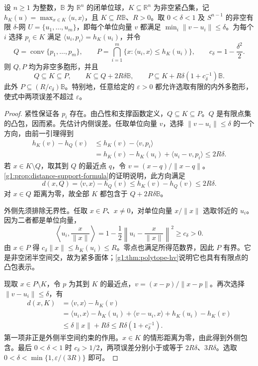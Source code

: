 \begin{theorem}\label{g1:thm:inner-outer-polytope-approximation}
	设 \(n\ge1\) 为整数，\(\mathbb B\) 为 \(\mathbb R^n\) 的闭单位球，\(K\subseteq\mathbb R^n\) 为非空紧凸集，记 \(h_K(u)=\max_{x\in K}\langle u,x\rangle\)，且 \(K\subseteq R\mathbb B\)、\(R>0\)。取 \(0<\delta<1\) 及 \(S^{n-1}\) 的非空有限 \(\delta\)-网 \(U=\{u_1,\ldots,u_m\}\)，即每个单位向量 \(v\) 都满足 \(\min_i\lVert v-u_i\rVert\le\delta\)。为每个 \(i\) 选择 \(p_i\in K\) 满足 \(\langle u_i,p_i\rangle=h_K(u_i)\)，并令
	\[
		Q=\operatorname{conv}\{p_1,\ldots,p_m\},\qquad
		P=\bigcap_{i=1}^m\{x:\langle u_i,x\rangle\le h_K(u_i)\},
		\qquad c_\delta=1-\frac{\delta^2}{2}.
	\]
	则 \(Q,P\) 均为非空多胞形，并且
	\begin{equation}\label{g1:eq:inner-outer-polytope-error}
		Q\subseteq K\subseteq P,\qquad
		K\subseteq Q+2R\delta\mathbb B,\qquad
		P\subseteq K+R\delta(1+c_\delta^{-1})\mathbb B.
	\end{equation}
	此外 \(P\subseteq(R/c_\delta)\mathbb B\)。特别地，任意给定的 \(\varepsilon>0\) 都允许选取有限的内外多胞形，使式中两项误差不超过 \(\varepsilon\)。
\end{theorem}
\begin{proof}
	紧性保证各 \(p_i\) 存在。由凸性和支撑函数定义，\(Q\subseteq K\subseteq P\)。\(Q\) 是有限点集的凸包，因而紧。先估计内侧误差。任取单位向量 \(v\)，选择 \(\lVert v-u_i\rVert\le\delta\) 的一个方向，由前一引理得到
	\begin{align*}
		h_K(v)-h_Q(v)
		&\le h_K(v)-\langle v,p_i\rangle\\
		&=h_K(v)-h_K(u_i)+\langle u_i-v,p_i\rangle
		\le2R\delta.
	\end{align*}
	若 \(x\in K\setminus Q\)，取其到 \(Q\) 的最近点 \(q\)，令 \(v=(x-q)/\lVert x-q\rVert\)。\cref{g1:prop:distance-support-formula}的证明说明，此方向满足
	\[
		d(x,Q)=\langle v,x\rangle-h_Q(v)
		\le h_K(v)-h_Q(v)\le2R\delta.
	\]
	对 \(x\in Q\) 距离为零，故全部 \(K\) 都包含于 \(Q+2R\delta\mathbb B\)。

	外侧先须排除无界性。任取 \(x\in P\)、\(x\ne0\)，对单位向量 \(x/\lVert x\rVert\) 选取邻近的 \(u_i\)。因为二者都是单位向量，
	\[
		\left\langle u_i,\frac{x}{\lVert x\rVert}\right\rangle
		=1-\frac12\left\lVert u_i-\frac{x}{\lVert x\rVert}\right\rVert^2
		\ge c_\delta>0.
	\]
	由 \(x\in P\) 得 \(c_\delta\lVert x\rVert\le h_K(u_i)\le R\)。零点也满足所得范数界，因此 \(P\) 有界。它是非空闭半空间交，故为紧多面体；\cref{g1:thm:polytope-hv}说明它也具有有限点的凸包表示。

	现取 \(x\in P\setminus K\)，令 \(p\) 为其到 \(K\) 的最近点，\(v=(x-p)/\lVert x-p\rVert\)。再次选择 \(\lVert v-u_i\rVert\le\delta\)，有
	\begin{align*}
		d(x,K)
		&=\langle v,x\rangle-h_K(v)\\
		&=\langle u_i,x\rangle-h_K(u_i)
		+\langle v-u_i,x\rangle+h_K(u_i)-h_K(v)\\
		&\le\delta\lVert x\rVert+R\delta
		\le R\delta(1+c_\delta^{-1}).
	\end{align*}
	第一项非正是外侧半空间约束的作用。\(x\in K\) 的情形距离为零，由此得到外侧包含。最后 \(0<\delta<1\) 时 \(c_\delta>1/2\)，两项误差分别小于或等于 \(2R\delta\)、\(3R\delta\)。选取 \(0<\delta<\min\{1,\varepsilon/(3R)\}\) 即可。
\end{proof}

